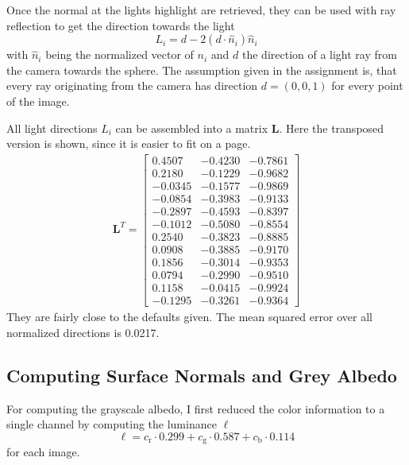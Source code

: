 \documentclass{paper}
\begin{document}
Once the normal at the lights highlight are retrieved, they can be used with ray reflection to get the direction towards the light
\begin{equation}
	L_i = d - 2(d\cdot \hat{n}_i)\hat{n}_i
\end{equation}
with $\hat{n}_i$ being the normalized vector of $n_i$ and $d$ the direction of a light ray from the camera towards the sphere.
The assumption given in the assignment is, 
that every ray originating from the camera has direction $d = (0,0,1)$ for every point of the image.

All light directions $L_i$ can be assembled into a matrix $\mathbf{L}$. Here the
transposed version is shown, since it is easier to fit on a page.
\begin{align*}
\mathbf{L}^T= 
\left[ 
\begin{array}{cccccccccccccc}
0.4507 & -0.4230 & -0.7861 \\ 0.2180 & -0.1229 & -0.9682 \\ -0.0345 & -0.1577 & -0.9869 \\ -0.0854 & -0.3983 & -0.9133 \\ -0.2897 & -0.4593 & -0.8397 \\ -0.1012 & -0.5080 & -0.8554 \\ 0.2540 & -0.3823 & -0.8885 \\ 0.0908 & -0.3885 & -0.9170 \\ 0.1856 & -0.3014 & -0.9353 \\ 0.0794 & -0.2990 & -0.9510 \\ 0.1158 & -0.0415 & -0.9924 \\ -0.1295 & -0.3261 & -0.9364 
\end{array} 
\right] 
\end{align*}
They are fairly close to the defaults given. The mean squared error over all normalized directions is 0.0217.

\subsection{Computing Surface Normals and Grey Albedo}


For computing the grayscale albedo, I first reduced the color information to a single channel by computing the luminance $\ell$
\begin{equation}
	\ell = c_\text{r} \cdot 0.299 + 
		c_\text{g} \cdot 0.587 + 
		c_\text{b} \cdot 0.114
\end{equation}
for each image. 
\end{document}
